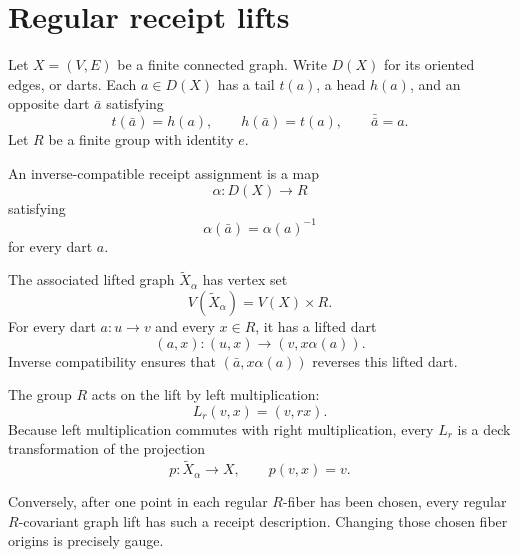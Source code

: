 \section{Regular receipt lifts}

Let $X=(V,E)$ be a finite connected graph. Write $D(X)$ for its oriented
edges, or darts. Each $a\in D(X)$ has a tail $t(a)$, a head $h(a)$, and an
opposite dart $\bar a$ satisfying
\[
t(\bar a)=h(a),\qquad h(\bar a)=t(a),\qquad \bar{\bar a}=a.
\]
Let $R$ be a finite group with identity $e$.

\begin{definition}
An inverse-compatible receipt assignment is a map
\[
\alpha:D(X)\longrightarrow R
\]
satisfying
\[
\alpha(\bar a)=\alpha(a)^{-1}
\]
for every dart $a$.
\end{definition}

The associated lifted graph $\widetilde X_{\alpha}$ has vertex set
\[
V(\widetilde X_{\alpha})=V(X)\times R.
\]
For every dart $a:u\to v$ and every $x\in R$, it has a lifted dart
\[
(a,x):(u,x)\longrightarrow (v,x\alpha(a)).
\]
Inverse compatibility ensures that $(\bar a,x\alpha(a))$ reverses this lifted
dart.

The group $R$ acts on the lift by left multiplication:
\[
L_r(v,x)=(v,rx).
\]
Because left multiplication commutes with right multiplication, every $L_r$
is a deck transformation of the projection
\[
p:\widetilde X_{\alpha}\longrightarrow X,\qquad p(v,x)=v.
\]

Conversely, after one point in each regular $R$-fiber has been chosen, every
regular $R$-covariant graph lift has such a receipt description. Changing
those chosen fiber origins is precisely gauge.
